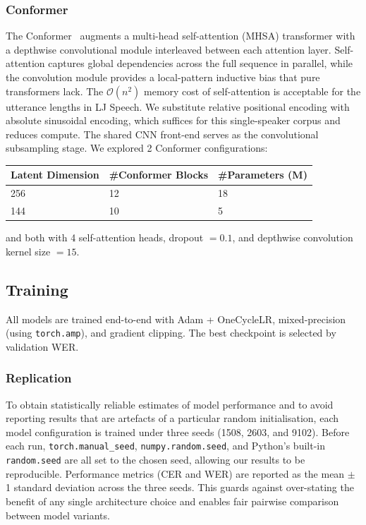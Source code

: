\subsubsection{Conformer}

The Conformer~\cite{gulati2020conformer} augments a multi-head self-attention (MHSA) transformer
with a depthwise convolutional module interleaved between each attention layer.
Self-attention captures global dependencies across the full sequence in parallel,
while the convolution module provides a local-pattern inductive bias that pure transformers lack.
The \(\mathcal{O}(n^2)\) memory cost of self-attention is acceptable for the utterance lengths
in LJ Speech.
We substitute relative positional encoding with absolute sinusoidal encoding, which suffices for this single-speaker corpus and reduces compute.
The shared CNN front-end serves as the convolutional subsampling stage.
We explored 2 Conformer configurations:

\begin{table}[h]
\label{tab:conformers}
  \centering
  \begin{tabular}{lll}
    \toprule
    Latent Dimension & \#Conformer Blocks & \#Parameters (M) \\
    \midrule
    256 & 12 & 18 \\
    144 & 10 & 5 \\
    \bottomrule
  \end{tabular}
\end{table}

and both with 4 self-attention heads, dropout $=0.1$, and depthwise convolution kernel size $=15$.

\subsection{Training}

All models are trained end-to-end with Adam + OneCycleLR, mixed-precision (using \texttt{torch.amp}),
and gradient clipping. The best checkpoint is selected by validation WER.

\subsubsection{Replication}

To obtain statistically reliable estimates of model performance and to avoid reporting results that
are artefacts of a particular random initialisation, each model configuration is trained under
three seeds (1508, 2603, and 9102). Before each run, \texttt{torch.manual\_seed}, \texttt{numpy.random.seed},
and Python's built-in \texttt{random.seed} are all set to the chosen seed, allowing our results to be reproducible.
Performance metrics (CER and WER) are reported as the mean \(\pm\) 1 standard deviation across the
three seeds.
This guards against over-stating the benefit of any single architecture choice and enables
fair pairwise comparison between model variants.
